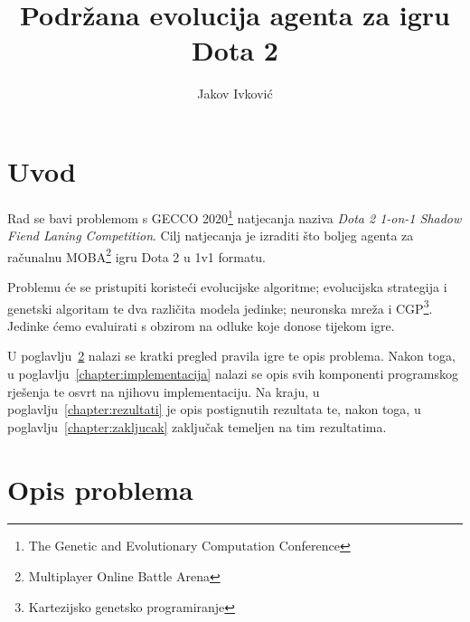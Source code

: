 \documentclass[times, utf8, zavrsni, numeric]{fer}
\begin{document}

\title{Podržana evolucija agenta za igru Dota 2}

\author{Jakov Ivković}

\maketitle

\izvornik{}


\tableofcontents

\chapter{Uvod}

Rad se bavi problemom s GECCO 2020\footnote{The Genetic and Evolutionary
Computation Conference} natjecanja naziva \emph{Dota 2 1-on-1 Shadow Fiend
Laning Competition}.  Cilj natjecanja je izraditi što boljeg agenta za
računalnu MOBA\footnote{Multiplayer Online Battle Arena} igru Dota 2 u 1v1
formatu.

Problemu će se pristupiti koristeći evolucijske algoritme; evolucijska
strategija i genetski algoritam te dva različita modela jedinke; neuronska
mreža i CGP\footnote{Kartezijsko genetsko programiranje }.  Jedinke ćemo evaluirati s obzirom na odluke koje donose
tijekom igre.

U poglavlju~\ref{chapter:opis-problema} nalazi se kratki pregled pravila igre te
opis problema. Nakon toga, u poglavlju~\ref{chapter:implementacija} nalazi se
opis svih komponenti programskog rješenja te osvrt na njihovu implementaciju. Na
kraju, u poglavlju~\ref{chapter:rezultati} je opis postignutih rezultata te,
nakon toga, u poglavlju~\ref{chapter:zakljucak} zaključak temeljen na tim
rezultatima.

\chapter{Opis problema}\label{chapter:opis-problema}
\end{document}
